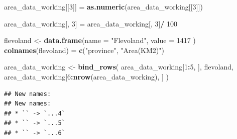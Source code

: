 \documentclass[
]{article}
\newenvironment{Shaded}{\begin{snugshade}}{\end{snugshade}}
\newcommand{\AttributeTok}[1]{\textcolor[rgb]{0.13,0.29,0.53}{#1}}
\newcommand{\DecValTok}[1]{\textcolor[rgb]{0.00,0.00,0.81}{#1}}
\newcommand{\FunctionTok}[1]{\textcolor[rgb]{0.13,0.29,0.53}{\textbf{#1}}}
\newcommand{\NormalTok}[1]{#1}
\newcommand{\OtherTok}[1]{\textcolor[rgb]{0.56,0.35,0.01}{#1}}
\newcommand{\SpecialCharTok}[1]{\textcolor[rgb]{0.81,0.36,0.00}{\textbf{#1}}}
\newcommand{\StringTok}[1]{\textcolor[rgb]{0.31,0.60,0.02}{#1}}
\begin{document}
\begin{Shaded}
\begin{Highlighting}[]
\NormalTok{area\_data\_working[[}\DecValTok{3}\NormalTok{]]  }\OtherTok{=} \FunctionTok{as.numeric}\NormalTok{(area\_data\_working[[}\DecValTok{3}\NormalTok{]])}

\NormalTok{area\_data\_working[, }\DecValTok{3}\NormalTok{] }\OtherTok{=}\NormalTok{ area\_data\_working[, }\DecValTok{3}\NormalTok{]}\SpecialCharTok{/} \DecValTok{100}

\NormalTok{flevoland }\OtherTok{\textless{}{-}} \FunctionTok{data.frame}\NormalTok{(}\AttributeTok{name =} \StringTok{"Flevoland"}\NormalTok{, }\AttributeTok{value =} \DecValTok{1417}\NormalTok{ )}
\FunctionTok{colnames}\NormalTok{(flevoland) }\OtherTok{=} \FunctionTok{c}\NormalTok{(}\StringTok{"province"}\NormalTok{, }\StringTok{"Area(KM2)"}\NormalTok{)}

\NormalTok{area\_data\_working }\OtherTok{\textless{}{-}} \FunctionTok{bind\_rows}\NormalTok{(}
\NormalTok{  area\_data\_working[}\DecValTok{1}\SpecialCharTok{:}\DecValTok{5}\NormalTok{, ], flevoland,  }
\NormalTok{  area\_data\_working[}\DecValTok{6}\SpecialCharTok{:}\FunctionTok{nrow}\NormalTok{(area\_data\_working), ]}
\NormalTok{)}
\end{Highlighting}
\end{Shaded}

\begin{verbatim}
## New names:
## New names:
## * `` -> `...4`
## * `` -> `...5`
## * `` -> `...6`
\end{verbatim}
\end{document}
